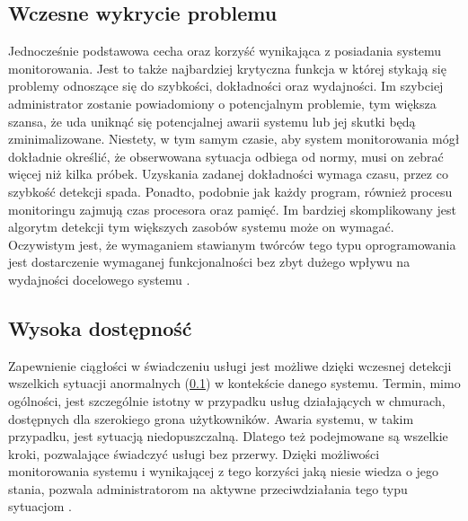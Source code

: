     \subsection{Wczesne wykrycie problemu}
    \label{chapter:monitoring:advantages:early_detection}
    Jednocześnie podstawowa cecha oraz korzyść wynikająca z posiadania systemu monitorowania. 
    Jest to także najbardziej krytyczna funkcja w której stykają się problemy odnoszące się
    do szybkości, dokładności oraz wydajności. Im szybciej administrator zostanie
    powiadomiony o potencjalnym problemie, tym większa szansa, że uda uniknąć się potencjalnej
    awarii systemu lub jej skutki będą zminimalizowane. Niestety, w tym samym czasie, 
    aby system monitorowania mógł dokładnie określić, że obserwowana sytuacja odbiega od normy,
    musi on zebrać więcej niż kilka próbek. Uzyskania zadanej dokładności wymaga czasu, 
    przez co szybkość detekcji spada. Ponadto, podobnie jak każdy program, również procesu
    monitoringu zajmują czas procesora oraz pamięć. Im bardziej skomplikowany jest algorytm
    detekcji tym większych zasobów systemu może on wymagać. Oczywistym jest, że wymaganiem
    stawianym twórców tego typu oprogramowania jest dostarczenie wymaganej funkcjonalności
    bez zbyt dużego wpływu na wydajności docelowego systemu \cite{monitoring_and_alerting}. 
    
    \subsection{Wysoka dostępność}
    \label{chapter:monitoring:advantages:high_availability}
    Zapewnienie ciągłości w świadczeniu usługi jest możliwe dzięki wczesnej detekcji
    wszelkich sytuacji anormalnych (\ref{chapter:monitoring:advantages:early_detection}) w kontekście danego systemu. 
    Termin, mimo ogólności, jest szczególnie istotny w przypadku usług działających w chmurach, dostępnych
    dla szerokiego grona użytkowników. Awaria systemu, w takim przypadku, jest sytuacją niedopuszczalną. Dlatego
    też podejmowane są wszelkie kroki, pozwalające świadczyć usługi bez przerwy. Dzięki możliwości
    monitorowania systemu i wynikającej z tego korzyści jaką niesie wiedza o jego stania, pozwala
    administratorom na aktywne przeciwdziałania tego typu sytuacjom \cite{monitoring_and_alerting}. 
    
